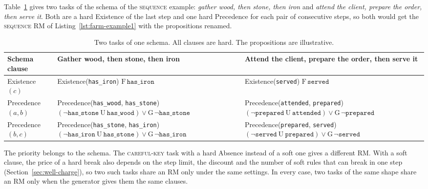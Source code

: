 \documentclass[11pt,english,listoffigures,listoftables]{tfgetsinf}
\newcommand{\runex}[1]{\textsc{#1}}  %
\begin{document}
Table~\ref{tab:schemas} gives two tasks of the schema of the \runex{sequence} example: \textit{gather wood, then stone, then iron} and \textit{attend the client, prepare the order, then serve it}. Both are a hard Existence of the last step and one hard Precedence for each pair of consecutive steps, so both would get the \runex{sequence} RM of Listing~\ref{lst:farm-example1} with the propositions renamed.

\begin{table}[H]
\centering
\footnotesize
\renewcommand{\arraystretch}{1.2}
\begin{tabularx}{\textwidth}{@{}>{\raggedright\arraybackslash}p{3.2cm}>{\raggedright\arraybackslash}X>{\raggedright\arraybackslash}X@{}}
\toprule
\textbf{Schema clause} & \textbf{Gather wood, then stone, then iron} & \textbf{Attend the client, prepare the order, then serve it} \\ \midrule
Existence$(c)$ & Existence(\texttt{has\_iron}) \newline $\mathrm{F}\,\texttt{has\_iron}$ & Existence(\texttt{served}) \newline $\mathrm{F}\,\texttt{served}$ \\
Precedence$(a,b)$ & Precedence(\texttt{has\_wood}, \texttt{has\_stone}) \newline $(\neg\texttt{has\_stone}\ \mathrm{U}\ \texttt{has\_wood}) \lor \mathrm{G}\,\neg\texttt{has\_stone}$ & Precedence(\texttt{attended}, \texttt{prepared}) \newline $(\neg\texttt{prepared}\ \mathrm{U}\ \texttt{attended}) \lor \mathrm{G}\,\neg\texttt{prepared}$ \\
Precedence$(b,c)$ & Precedence(\texttt{has\_stone}, \texttt{has\_iron}) \newline $(\neg\texttt{has\_iron}\ \mathrm{U}\ \texttt{has\_stone}) \lor \mathrm{G}\,\neg\texttt{has\_iron}$ & Precedence(\texttt{prepared}, \texttt{served}) \newline $(\neg\texttt{served}\ \mathrm{U}\ \texttt{prepared}) \lor \mathrm{G}\,\neg\texttt{served}$ \\ \bottomrule
\end{tabularx}
\caption{Two tasks of one schema. All clauses are hard. The propositions are illustrative.}
\label{tab:schemas}
\end{table}

The priority belongs to the schema. The \runex{careful-key} task with a hard Absence instead of a soft one gives a different RM. With a soft clause, the price of a hard break also depends on the step limit, the discount and the number of soft rules that can break in one step (Section~\ref{sec:well-charge}), so two such tasks share an RM only under the same settings. In every case, two tasks of the same shape share an RM only when the generator gives them the same clauses.
\end{document}
